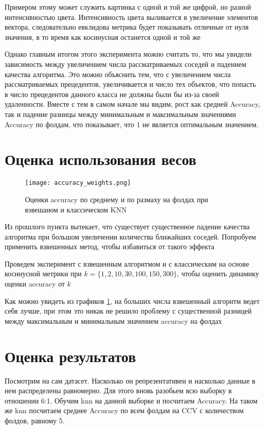 \documentclass{article}
\begin{document}
    \begin{leftrule}
        Примером этому может служить картинка с одной и той же цифрой, но разной интенсивностью цвета. Интенсивность цвета выливается в увеличение элементов вектора, следовательно евклидова метрика будет показывать отличные от нуля значения, в то время как косинусная останется одной и той же
    \end{leftrule}
    
    Однако главным итогом этого эксперимента можно считать то, что мы увидели зависимость между увеличением числа рассматриваемых соседей и падением качества алгоритма. Это можно объяснить тем, что с увеличением числа рассматриваемых прецедентов, увеличивается и число тех объектов, что попасть в число прецедентов данного класса не должны были бы из-за своей удаленности. Вместе с тем в самом начале мы видим, рост как средней Accuracy, так и падение разницы между минимальным и максимальным значениями Accuracy по фолдам, что показывает, что 1 не является оптимальным значением.

\section{Оценка использования весов}

    \begin{figure}[b]
        \centering
        \texttt{[image: accuracy\_weights.png]}
        \caption{Оценки accuracy по среднему и по размаху на фолдах при взвешаном и  классическом KNN}
        \label{fig:weights_accuracy}
    \end{figure}
    
    Из прошлого пункта вытекает, что существует существенное падение качества алгоритма при большом увеличении количества ближайших соседей. Попробуем применить взвешенных метод, чтобы избавиться от такого эффекта

    Проведем эксперимент с взвешенным алгоритмом и с классическим на основе косинусной метрики при $k = \{1, 2, 10, 30, 100, 150, 300\}$, чтобы оценить динамику оценки accuracy от $k$

    Как можно увидеть из графиков \ref{fig:weights_accuracy}, на больших числа взвешенный алгоритм ведет себя лучше, при этом это никак не решило проблему с существенной разницей между максимальным и минимальным значением accuracy на фолдах


\section{Оценка результатов}
    Посмотрим на сам датасет. Насколько он репрезентативен и насколько данные в нем распределены равномерно. Для этого вновь разобьем всю выборку в отношении 6:1. Обучим knn на данной выборке и посчитаем Accuracy. На таком же knn посчитаем среднее Accuracy по всем фолдам на CCV  с количеством фолдов, равному 5. 
    
\end{document}
